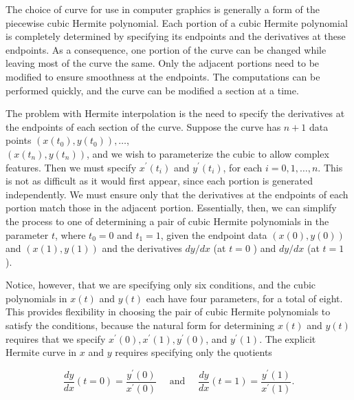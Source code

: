 %
The choice of curve for use in computer graphics is generally a form of the piecewise cubic Hermite polynomial. Each portion of a cubic Hermite polynomial is completely determined by specifying its endpoints and the derivatives at these endpoints. As a consequence, one portion of the curve can be changed while leaving most of the curve the same. Only the adjacent portions need to be modified to ensure smoothness at the endpoints. The computations can be performed quickly, and the curve can be modified a section at a time.

The problem with Hermite interpolation is the need to specify the derivatives at the endpoints of each section of the curve. Suppose the curve has $n+1$ data points $\left(x\left(t_{0}\right), y\left(t_{0}\right)\right), \ldots$,\\$\left(x\left(t_{n}\right), y\left(t_{n}\right)\right)$, and we wish to parameterize the cubic to allow complex features. Then we must specify $x^{\prime}\left(t_{i}\right)$ and $y^{\prime}\left(t_{i}\right)$, for each $i=0,1, \ldots, n$. This is not as difficult as it would first appear, since each portion is generated independently. We must ensure only that the derivatives at the endpoints of each portion match those in the adjacent portion. Essentially, then, we can simplify the process to one of determining a pair of cubic Hermite polynomials in the parameter $t$, where $t_{0}=0$ and $t_{1}=1$, given the endpoint data $(x(0), y(0))$ and $(x(1), y(1))$ and the derivatives $d y / d x$ (at $t=0$ ) and $d y / d x$ (at $t=1$ ).

Notice, however, that we are specifying only six conditions, and the cubic polynomials in $x(t)$ and $y(t)$ each have four parameters, for a total of eight. This provides flexibility in choosing the pair of cubic Hermite polynomials to satisfy the conditions, because the natural form for determining $x(t)$ and $y(t)$ requires that we specify $x^{\prime}(0), x^{\prime}(1), y^{\prime}(0)$, and $y^{\prime}(1)$. The explicit Hermite curve in $x$ and $y$ requires specifying only the quotients

$$
\frac{d y}{d x}(t=0)=\frac{y^{\prime}(0)}{x^{\prime}(0)} \quad \text { and } \quad \frac{d y}{d x}(t=1)=\frac{y^{\prime}(1)}{x^{\prime}(1)} .
$$

